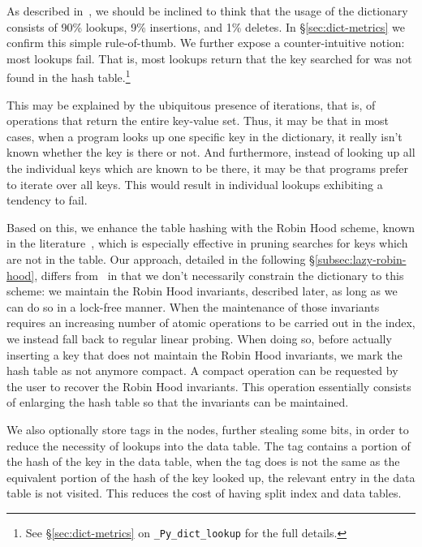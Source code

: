 As described in~\cite[\S13.1]{art-mp}, we should be inclined to think that the usage of the dictionary consists of 90\% lookups, 9\% insertions, and 1\% deletes.
In \S\ref{sec:dict-metrics} we confirm this simple rule-of-thumb.
We further expose a counter-intuitive notion: most lookups fail.
That is, most lookups return that the key searched for was not found in the hash table.\footnote{%
	See \S\ref{sec:dict-metrics} on \texttt{\_Py\_dict\_lookup} for the full details.
}

This may be explained by the ubiquitous presence of iterations, that is, of operations that return the entire key-value set.
Thus, it may be that in most cases, when a program looks up one specific key in the dictionary, it really isn't known whether the key is there or not.
And furthermore, instead of looking up all the individual keys which are known to be there, it may be that programs prefer to iterate over all keys.
This would result in individual lookups exhibiting a tendency to fail.

Based on this, we enhance the table hashing with the Robin Hood scheme, known in the literature~\cite{robin-hood,bolt}, which is especially effective in pruning searches for keys which are not in the table.
Our approach, detailed in the following \S\ref{subsec:lazy-robin-hood}, differs from~\cite{bolt} in that we don't necessarily constrain the dictionary to this scheme: we maintain the Robin Hood invariants, described later, as long as we can do so in a lock-free manner.
When the maintenance of those invariants requires an increasing number of atomic operations to be carried out in the index, we instead fall back to regular linear probing.
When doing so, before actually inserting a key that does not maintain the Robin Hood invariants, we mark the hash table as not anymore compact.
A compact operation can be requested by the user to recover the Robin Hood invariants.
This operation essentially consists of enlarging the hash table so that the invariants can be maintained.

We also optionally store tags in the nodes, further stealing some bits, in order to reduce the necessity of lookups into the data table.
The tag contains a portion of the hash of the key in the data table, when the tag does is not the same as the equivalent portion of the hash of the key looked up, the relevant entry in the data table is not visited.
This reduces the cost of having split index and data tables.

